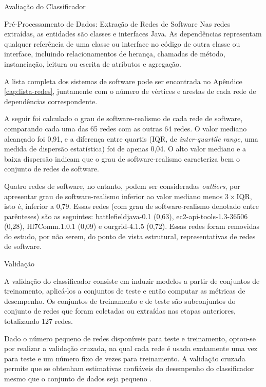 \begin{section}{Avaliação do Classificador}
\begin{subsection}{Pré-Processamento de Dados: Extração de Redes de Software}
	Nas redes extraídas, as entidades são classes e interfaces Java. As dependências representam qualquer referência de uma classe ou interface no código de outra classe ou interface, incluindo relacionamentos de herança, chamadas de método, instanciação, leitura ou escrita de atributos e agregação.

	A lista completa dos sistemas de software pode ser encontrada no Apêndice \ref{cap:lista-redes}, juntamente com o número de vértices e arestas de cada rede de dependências correspondente. %
	
	A seguir foi calculado o grau de software-realismo de cada rede de software, comparando cada uma das 65 redes com as outras 64 redes. O valor mediano alcançado foi 0,91, e a diferença entre quartis (IQR, de \emph{inter-quartile range}, uma medida de dispersão estatística) foi de apenas 0,04. O alto valor mediano e a baixa dispersão indicam que o grau de software-realismo caracteriza bem o conjunto de redes de software.
	
	Quatro redes de software, no entanto, podem ser consideradas \emph{outliers}, por apresentar grau de software-realismo inferior ao valor mediano menos $3 \times \mbox{IQR}$, isto é, inferior a 0,79. Essas redes (com grau de software-realismo denotado entre parênteses) são as seguintes: battlefieldjava-0.1 (0,63), ec2-api-tools-1.3-36506 (0,28), Hl7Comm.1.0.1 (0,09) e ourgrid-4.1.5 (0,72). Essas redes foram removidas do estudo, por não serem, do ponto de vista estrutural, representativas de redes de software.

\end{subsection}

\begin{subsection}{Validação}

	A validação do classificador consiste em induzir modelos a partir de conjuntos de treinamento, aplicá-los a conjuntos de teste e então computar as métricas de desempenho. Os conjuntos de treinamento e de teste são subconjuntos do conjunto de redes que foram coletadas ou extraídas nas etapas anteriores, totalizando 127 redes.
	
	Dado o número pequeno de redes disponíveis para teste e treinamento, optou-se por realizar a validação cruzada, na qual cada rede é usada exatamente uma vez para teste e um número fixo de vezes para treinamento. A validação cruzada permite que se obtenham estimativas confiáveis do desempenho do classificador mesmo que o conjunto de dados seja pequeno \cite{Witten2005}.
	

\end{subsection}
\end{section}
